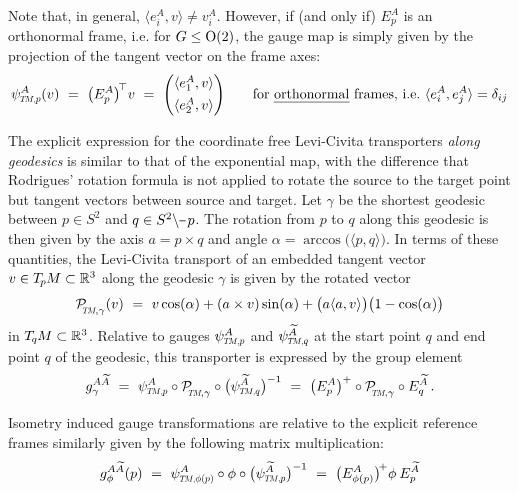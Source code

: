 Note that, in general, $\langle e_i^A, v \rangle \neq v^A_i$.
However, if (and only if) $E^A_p$ is an orthonormal frame, i.e. for $G\leq\operatorname{O}(2)$, the gauge map is simply given by the projection of the tangent vector on the frame axes:
\begin{align}\label{eq:embedding_gauge_map_orthonormal_frame}
    \psiTMp^A(v)
    \ =\ 
    \big(E^A_p \big)^{\!\top} v
    \ =\ 
    \Bigg( \mkern-9mu
    \begin{array}{cc}
        \langle e_1^A, v \rangle \\[4pt]
        \langle e_2^A, v \rangle
    \end{array}
    \mkern-9mu \Bigg)
    \qquad \textup{for \emph{orthonormal} frames, i.e.}\ \langle e_i^A, e_j^A \rangle = \delta_{ij}
\end{align}


The explicit expression for the coordinate free Levi-Civita transporters \emph{along geodesics} is similar to that of the exponential map, with the difference that Rodrigues' rotation formula is not applied to rotate the source to the target point but tangent vectors between source and target.
Let $\gamma$ be the shortest geodesic between $p\in S^2$ and $q\in {S^2 \backslash \mkern-1mu\minus\mkern1mu p}$.
The rotation from $p$ to $q$ along this geodesic is then given by the axis $a = p\times q$ and angle $\alpha = \arccos\!\big( \langle p,q\rangle \big)$.
In terms of these quantities, the Levi-Civita transport of an embedded tangent vector $v\in T_{\mkern-1.5mu p}\mkern-.5muM \subset \mathbb{R}^3$ along the geodesic $\gamma$ is given by the rotated vector
\begin{align}\label{eq:sphere_transport_embedded}
    \PTMgamma(v)\ =\ v \cos(\alpha) + (a\times v) \sin(\alpha) + \big(a\langle a,v\rangle\big) \big(1- \cos(\alpha) \big)
\end{align}
in $T_{\mkern-1.5mu q}\mkern-.5muM \subset \mathbb{R}^3$.
Relative to gauges $\psiTMp^A$ and $\psiTMq^{\widetilde{A}}$ at the start point $q$ and end point $q$ of the geodesic, this transporter is expressed by the group element
\begin{align}\label{eq:sphere_transporter_explicit_in_coords}
    g_\gamma^{A\widetilde{A}}
    \ =\ \psiTMp^A \circ \PTMgamma \circ \big(\psiTMq^{\widetilde{A}}\big)^{-1}
    \ =\ \big(E_p^A\big)^+ \circ \PTMgamma \circ E_q^{\widetilde{A}} \,.
\end{align}


Isometry induced gauge transformations are relative to the explicit reference frames similarly given by the following matrix multiplication:
\begin{align}\label{eq:embedded_sphere_isom_induced_gauge_trafo}
    g_\phi^{A\widetilde{A}}(p)
    \ =\ \psiTMphip^A \circ \phi \circ \big(\psiTMp^{\widetilde{A}}\big)^{-1}
    \ =\ \big(E_{\phi(p)}^A \big)^{\!+} \phi\: E_p^{\widetilde{A}}
\end{align}

